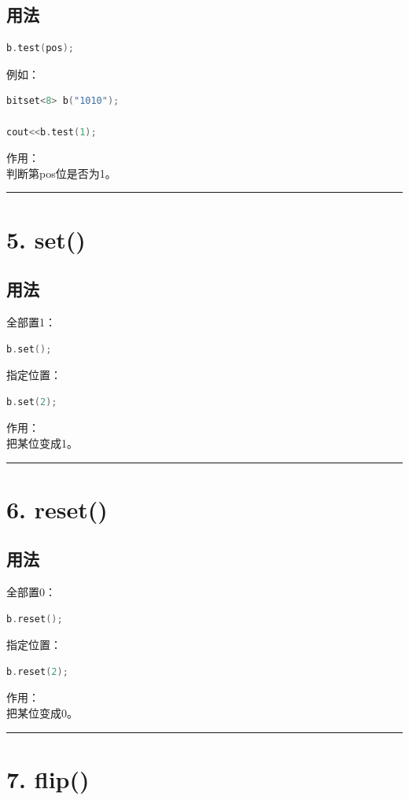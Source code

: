 \documentclass[9pt,twocolumn]{extarticle}
\begin{document}
\subsection{用法}
\begin{lstlisting}[language=C++]
b.test(pos);
\end{lstlisting}
例如：
\begin{lstlisting}[language=C++]
bitset<8> b("1010");

cout<<b.test(1);
\end{lstlisting}
作用：\\
判断第pos位是否为1。

\noindent\rule{\linewidth}{0.4pt}

\section{5. set()}

\subsection{用法}
全部置1：
\begin{lstlisting}[language=C++]
b.set();
\end{lstlisting}
指定位置：
\begin{lstlisting}[language=C++]
b.set(2);
\end{lstlisting}
作用：\\
把某位变成1。

\noindent\rule{\linewidth}{0.4pt}

\section{6. reset()}

\subsection{用法}
全部置0：
\begin{lstlisting}[language=C++]
b.reset();
\end{lstlisting}
指定位置：
\begin{lstlisting}[language=C++]
b.reset(2);
\end{lstlisting}
作用：\\
把某位变成0。

\noindent\rule{\linewidth}{0.4pt}

\section{7. flip()}
\end{document}

